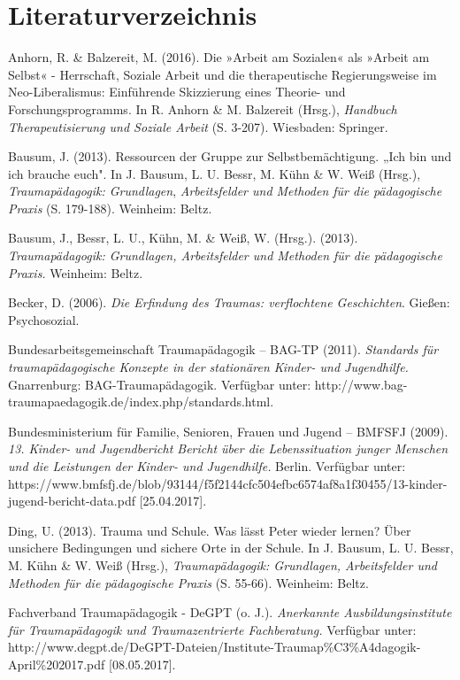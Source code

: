 \section{Literaturverzeichnis}

\setlength{\parindent}{0pt}
\hang
Anhorn, R. \& Balzereit, M. (2016). Die »Arbeit am Sozialen« als »Arbeit am Selbst« - Herrschaft, Soziale Arbeit und die therapeutische Regierungsweise im Neo-Liberalismus: Einf{\"u}hrende Skizzierung eines Theorie- und Forschungsprogramms. In R. Anhorn \& M. Balzereit (Hrsg.), \textit{Handbuch Therapeutisierung und Soziale Arbeit} (S. 3-207). Wiesbaden: Springer.

\hang
Bausum, J. (2013). Ressourcen der Gruppe zur Selbstbem{\"a}chtigung. „Ich bin und ich brauche euch". In J. Bausum, L. U. Bessr, M. Kühn \& W. Weiß (Hrsg.), \textit{Traumapädagogik: Grundlagen}, \textit{Arbeitsfelder und Methoden für die pädagogische Praxis} (S. 179-188). Weinheim: Beltz.

\hang
Bausum, J., Bessr, L. U., Kühn, M. \& Weiß, W. (Hrsg.). (2013). \textit{Traumapädagogik: Grundlagen, Arbeitsfelder und Methoden für die pädagogische Praxis.} Weinheim: Beltz.

\hang
Becker, D. (2006). \textit{Die Erfindung des Traumas: verflochtene Geschichten}. Gießen: Psychosozial.

\hang
Bundesarbeitsgemeinschaft Traumap{\"a}dagogik – BAG-TP (2011). \textit{Standards für traumapädagogische Konzepte in der stationären Kinder- und Jugendhilfe.} Gnarrenburg: BAG-Traumapädagogik. Verfügbar unter: http://www.bag-traumapaedagogik.de/index.php/standards.html\break[22.03.2017].

\hang
Bundesministerium für Familie, Senioren, Frauen und Jugend – BMFSFJ (2009). \textit{13. Kinder- und Jugendbericht Bericht über die Lebenssituation junger Menschen und die Leistungen der Kinder- und Jugendhilfe.} Berlin. Verfügbar unter:\\ https://www.bmfsfj.de/blob/93144/f5f2144cfc504efbc6574af8a1f30455/13-kinder-jugend-bericht-data.pdf [25.04.2017].

\hang
Ding, U. (2013). Trauma und Schule. Was l{\"a}sst Peter wieder lernen? {\"U}ber unsichere Bedingungen und sichere Orte in der Schule. In J. Bausum, L. U. Bessr, M. Kühn \& W. Weiß (Hrsg.), \textit{Traumapädagogik: Grundlagen, Arbeitsfelder und Methoden für die pädagogische Praxis} (S. 55-66). Weinheim: Beltz.

\hang
Fachverband Traumapädagogik - DeGPT (o. J.). \textit{Anerkannte Ausbildungsinstitute für Traumapädagogik und Traumazentrierte Fachberatung.} Verfügbar unter: http://www.degpt.de/DeGPT-Dateien/Institute-Traumap\%C3\%A4dagogik-April\%202017.pdf [08.05.2017].

